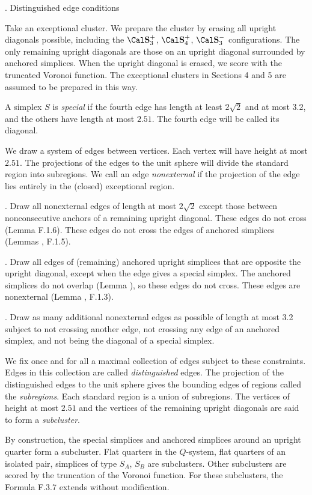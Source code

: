 \subhead {}.  Distinguished edge conditions\endsubhead

Take an exceptional cluster.  We prepare the cluster by erasing
all upright diagonals possible, including the $\Splus$, $\Sfour$, $\Sminus$ configurations.
The only remaining upright diagonals are 
those on an upright diagonal surrounded by anchored
simplices.
When the upright diagonal is erased, we score
with the truncated Voronoi function.
The exceptional clusters in Sections 4 and 5 are assumed
to be prepared in this way.


A simplex $S$ is {\it special\/} if the
fourth edge has length at least $2\sqrt{2}$
and at most $3.2$,
and the others have length at most $2.51$.
The fourth edge will be called its diagonal.


We draw a system of edges between
vertices.  Each vertex will have height at most $2.51$.
  The projections of the edges
to the unit sphere will divide the standard region into subregions.
We call an edge {\it nonexternal\/} if the projection of the edge
	lies entirely in the (closed) exceptional region.  

.  Draw all nonexternal edges of length at most $2\sqrt{2}$ except
	those between nonconsecutive anchors of a remaining upright
	diagonal.
These edges do not cross (Lemma F.1.6).
These edges do not cross the edges of anchored simplices
	(Lemmas , F.1.5).

.  Draw all edges of (remaining) anchored upright simplices
that are opposite the upright diagonal,
	except when the edge gives a special simplex. 
The anchored simplices do not overlap (Lemma ), so these
	edges do not cross.  
	These edges are nonexternal (Lemma , F.1.3).

.  Draw as many additional nonexternal edges as possible of
	length at most 3.2 subject to not crossing another edge, not
crossing any edge of an anchored simplex, and not being the diagonal of a
special simplex.

We fix once and for all a maximal collection of edges subject
to these constraints.
Edges in this collection are called {\it distinguished\/} edges.
The projection of the distinguished edges to the unit sphere
gives the bounding edges of regions called the {\it subregions}.  Each
standard region is a union of subregions.
The vertices of height at most $2.51$ and the vertices of the
remaining upright diagonals are said
to form a {\it subcluster}.


By construction, the special simplices and anchored simplices
around an upright quarter form a
subcluster.  Flat quarters in the $Q$-system, flat quarters
of an isolated pair, simplices of type $S_A$, $S_B$ are
subclusters.
	  Other
subclusters are scored by the truncation of the Voronoi function.
For these subclusters, 
the Formula F.3.7 extends without modification.

